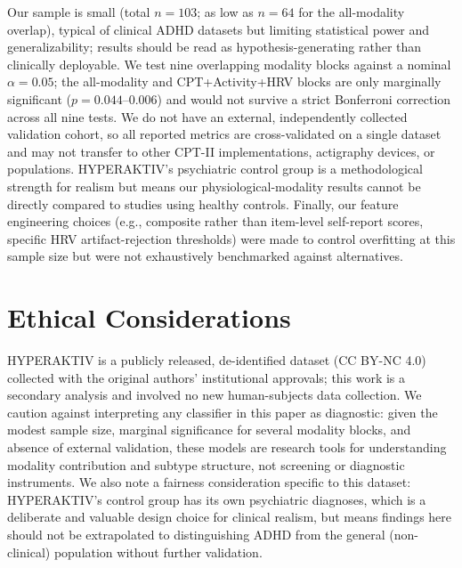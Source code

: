 \documentclass[11pt]{article}
\begin{document}
Our sample is small (total $n=103$; as low as $n=64$ for the all-modality overlap), typical of clinical ADHD datasets but limiting statistical power and generalizability; results should be read as hypothesis-generating rather than clinically deployable. We test nine overlapping modality blocks against a nominal $\alpha=0.05$; the all-modality and CPT+Activity+HRV blocks are only marginally significant ($p=0.044$--$0.006$) and would not survive a strict Bonferroni correction across all nine tests. We do not have an external, independently collected validation cohort, so all reported metrics are cross-validated on a single dataset and may not transfer to other CPT-II implementations, actigraphy devices, or populations. HYPERAKTIV's psychiatric control group is a methodological strength for realism but means our physiological-modality results cannot be directly compared to studies using healthy controls. Finally, our feature engineering choices (e.g., composite rather than item-level self-report scores, specific HRV artifact-rejection thresholds) were made to control overfitting at this sample size but were not exhaustively benchmarked against alternatives.

\section*{Ethical Considerations}

HYPERAKTIV is a publicly released, de-identified dataset (CC BY-NC 4.0) collected with the original authors' institutional approvals; this work is a secondary analysis and involved no new human-subjects data collection. We caution against interpreting any classifier in this paper as diagnostic: given the modest sample size, marginal significance for several modality blocks, and absence of external validation, these models are research tools for understanding modality contribution and subtype structure, not screening or diagnostic instruments. We also note a fairness consideration specific to this dataset: HYPERAKTIV's control group has its own psychiatric diagnoses, which is a deliberate and valuable design choice for clinical realism, but means findings here should not be extrapolated to distinguishing ADHD from the general (non-clinical) population without further validation.


\end{document}
